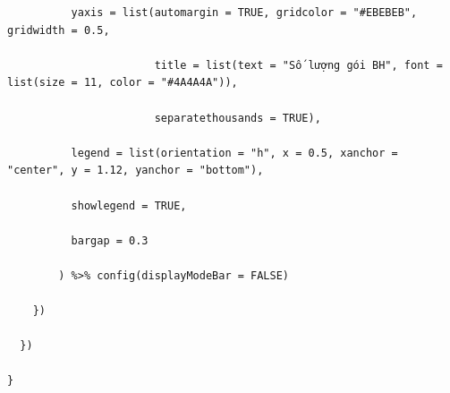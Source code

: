 \documentclass[12pt, a4paper]{article}
\begin{document}
\begin{lstlisting}
          yaxis = list(automargin = TRUE, gridcolor = "#EBEBEB", gridwidth = 0.5,

                       title = list(text = "Số lượng gói BH", font = list(size = 11, color = "#4A4A4A")),

                       separatethousands = TRUE),

          legend = list(orientation = "h", x = 0.5, xanchor = "center", y = 1.12, yanchor = "bottom"),

          showlegend = TRUE,

          bargap = 0.3

        ) %>% config(displayModeBar = FALSE)

    })

  })

}
\end{lstlisting}
\newpage
\end{document}
